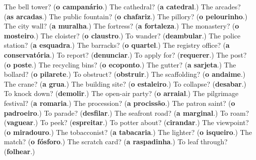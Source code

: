 \begin{tcolorbox}[breakable,colback=teal!4,colframe=teal!35!black,title={Before you move on}]
The bell tower? (\textbf{o campanário}.) The cathedral? (\textbf{a catedral}.) The arcades? (\textbf{as arcadas}.) The public fountain? (\textbf{o chafariz}.) The pillory? (\textbf{o pelourinho}.) The city wall? (\textbf{a muralha}.) The fortress? (\textbf{a fortaleza}.) The monastery? (\textbf{o mosteiro}.) The cloister? (\textbf{o claustro}.) To wander? (\textbf{deambular}.) The police station? (\textbf{a esquadra}.) The barracks? (\textbf{o quartel}.) The registry office? (\textbf{a conservatória}.) To report? (\textbf{denunciar}.) To apply for? (\textbf{requerer}.) The post? (\textbf{o poste}.) The recycling bins? (\textbf{o ecoponto}.) The gutter? (\textbf{a sarjeta}.) The bollard? (\textbf{o pilarete}.) To obstruct? (\textbf{obstruir}.) The scaffolding? (\textbf{o andaime}.) The crane? (\textbf{a grua}.) The building site? (\textbf{o estaleiro}.) To collapse? (\textbf{desabar}.) To knock down? (\textbf{demolir}.) The open-air party? (\textbf{o arraial}.) The pilgrimage festival? (\textbf{a romaria}.) The procession? (\textbf{a procissão}.) The patron saint? (\textbf{o padroeiro}.) To parade? (\textbf{desfilar}.) The seafront road? (\textbf{a marginal}.) To roam? (\textbf{vaguear}.) To peek? (\textbf{espreitar}.) To potter about? (\textbf{cirandar}.) The viewpoint? (\textbf{o miradouro}.) The tobacconist? (\textbf{a tabacaria}.) The lighter? (\textbf{o isqueiro}.) The match? (\textbf{o fósforo}.) The scratch card? (\textbf{a raspadinha}.) To leaf through? (\textbf{folhear}.)
\end{tcolorbox}
